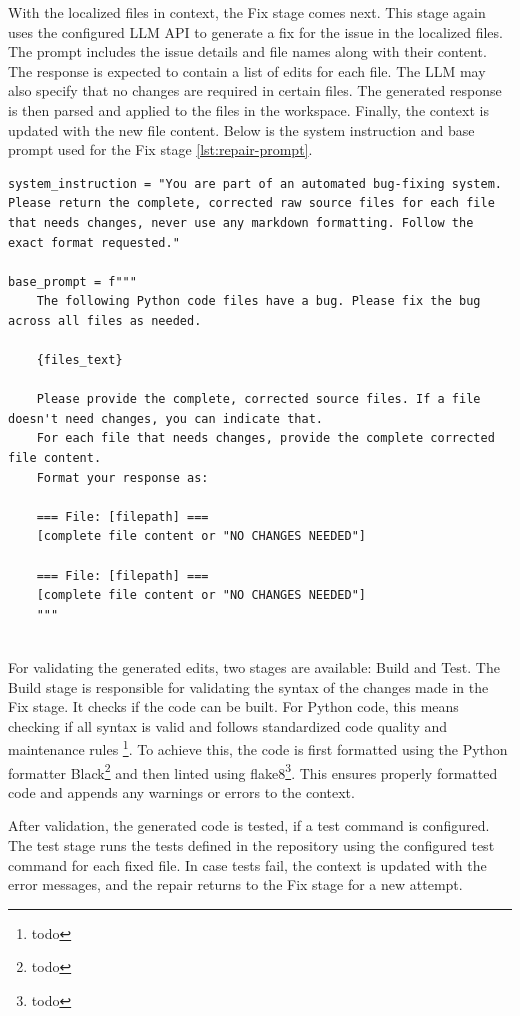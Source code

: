With the localized files in context, the Fix stage comes next. This stage again uses the configured \ac{LLM} API to generate a fix for the issue in the localized files. The prompt includes the issue details and file names along with their content. The response is expected to contain a list of edits for each file. The \ac{LLM} may also specify that no changes are required in certain files. The generated response is then parsed and applied to the files in the workspace. Finally, the context is updated with the new file content. Below is the system instruction and base prompt used for the Fix stage \ref{lst:repair-prompt}.

\begin{lstlisting}[caption={Repair Prompt}, label={lst:repair-prompt}]
system_instruction = "You are part of an automated bug-fixing system. Please return the complete, corrected raw source files for each file that needs changes, never use any markdown formatting. Follow the exact format requested."

base_prompt = f"""
    The following Python code files have a bug. Please fix the bug across all files as needed.

    {files_text}

    Please provide the complete, corrected source files. If a file doesn't need changes, you can indicate that.
    For each file that needs changes, provide the complete corrected file content.
    Format your response as:

    === File: [filepath] ===
    [complete file content or "NO CHANGES NEEDED"]

    === File: [filepath] ===
    [complete file content or "NO CHANGES NEEDED"]
    """
    
\end{lstlisting}

For validating the generated edits, two stages are available: Build and Test. The Build stage is responsible for validating the syntax of the changes made in the Fix stage. It checks if the code can be built. For Python code, this means checking if all syntax is valid and follows standardized code quality and maintenance rules \footnote{todo}. To achieve this, the code is first formatted using the Python formatter Black\footnote{todo} and then linted using flake8\footnote{todo}. This ensures properly formatted code and appends any warnings or errors to the context.

After validation, the generated code is tested, if a test command is configured. The test stage runs the tests defined in the repository using the configured test command for each fixed file. In case tests fail, the context is updated with the error messages, and the repair returns to the Fix stage for a new attempt.

